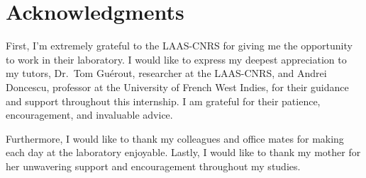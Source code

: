 \chapter*{Acknowledgments}
\label{chap:acknowledgments}
\thispagestyle{empty}

First, I'm extremely grateful to the LAAS-CNRS for giving me the opportunity to work in their laboratory. I
would like to express my deepest appreciation to my tutors, Dr.~Tom Guérout, researcher at the LAAS-CNRS,
and Andrei Doncescu, professor at the University of French West Indies, for their guidance and support
throughout this internship. I am grateful for their patience, encouragement, and invaluable advice.

Furthermore, I would like to thank my colleagues and office mates for making each day at the laboratory enjoyable.
Lastly, I would like to thank my mother for her unwavering support and encouragement throughout my studies.